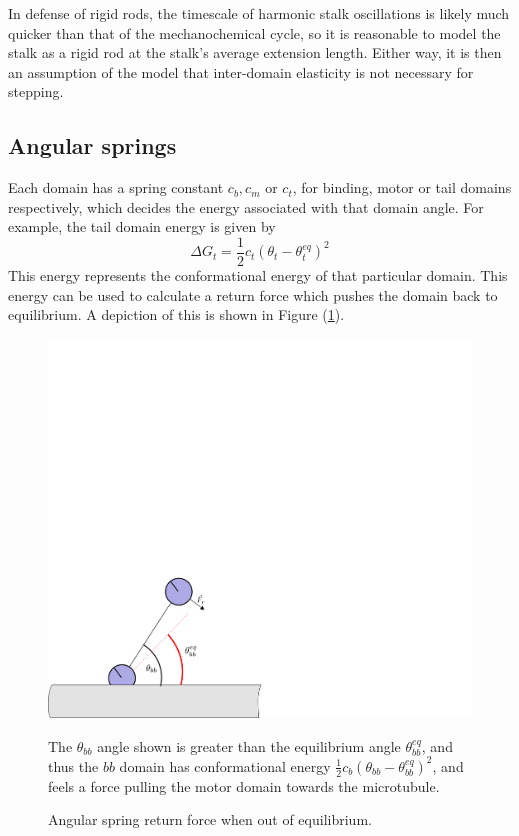 \documentclass[
11pt, %
english, %
singlespacing, %
headsepline, %
chapterinoneline, %
]{MastersDoctoralThesis} %
\begin{document}
In defense of rigid rods, the timescale of harmonic stalk oscillations is likely much quicker than that of the mechanochemical cycle, so it is reasonable to model the stalk as a rigid rod at the stalk's average extension length. Either way, it is then an assumption of the model that inter-domain elasticity is not necessary for stepping.\\

\subsection{Angular springs}
Each domain has a spring constant $c_b, c_m$ or $c_t$, for binding, motor or tail domains respectively, which decides the energy associated with that domain angle. For example, the tail domain energy is given by
%
\begin{equation}
  \Delta G_t = \frac12c_t\left(\theta_t - \theta_t^{eq}\right)^2
\end{equation}
%
This energy represents the conformational energy of that particular domain. This energy can be used to calculate a return force which pushes the domain back to equilibrium. A depiction of this is shown in Figure (\ref{fig:angular-spring}).\\

\begin{figure}[h]
  \centering
  \includegraphics[width=.65\textwidth]{../figures/angular-spring}
  \caption{Angular spring return force when out of equilibrium.}{The $\theta_{bb}$ angle shown is greater than the equilibrium angle $\theta_{bb}^{eq}$, and thus the $bb$ domain has conformational energy $\frac{1}{2}c_b\left(\theta_{bb}-\theta_{bb}^{eq}\right)^2$, and feels a force pulling the motor domain towards the microtubule.}
  \label{fig:angular-spring}
\end{figure}
\end{document}
